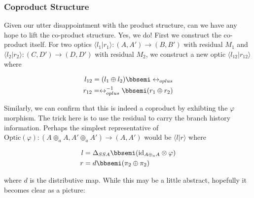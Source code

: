 \documentclass[letterpaper, 10 pt, conference]{ieeeconf}  %
\begin{document}
\subsubsection{Coproduct Structure}

Given our utter disappointment with the product structure, can we have any
hope to lift the co-product structure. Yes, we do! First we construct the
co-product itself. For two optics $\langle l_1 | r_1 \rangle: (A, A') \to (B, B')$
with residual $M_1$ and $\langle l_2 | r_2 \rangle: (C, D') \to (D, D')$ with residual $M_2$,
we construct a new optic $\langle l_{12} | r_{12} \rangle$ where

\begin{equation}
\begin{split}
l_{12} = (l_1 \oplus l_2) \bbsemi \leftrightarrow_{oplus} \\
r_{12} = \leftrightarrow_{oplus}^{-1} \bbsemi (r_1 \oplus r_2)
\end{split}
\end{equation}

Similarly, we can confirm that this is indeed a coproduct by exhibting the $\varphi$
morphism. The trick here is to use the
residual to carry the branch history information. Perhaps the simplest
representative of $\text{Optic}(\varphi): (A \oplus_a A, A' \oplus_a A') \to (A, A')$ would be $\langle l | r \rangle$ where

\begin{equation}
\begin{split}
l &= \Delta_{SSA} \bbsemi (\text{id}_{A \oplus_a A} \otimes \varphi) \\
r &= d \bbsemi (\pi_2 \oplus \pi_2)
\end{split}
\end{equation}

where $d$ is the distributive map. While this may be a little abstract, hopefully
it becomes clear as a picture:
\end{document}
